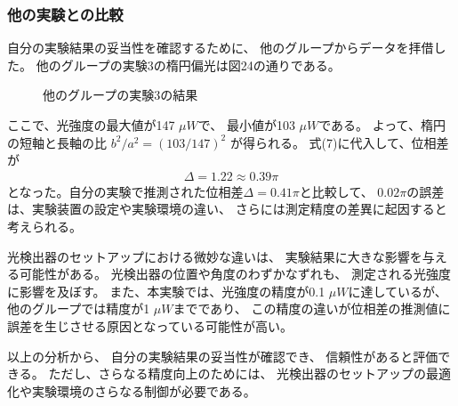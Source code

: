 \documentclass{article}
\begin{document}
\subsubsection*{他の実験との比較}
\begin{spacing}{1.2}
    自分の実験結果の妥当性を確認するために、
    他のグループからデータを拝借した。
    他のグループの実験3の楕円偏光は図24の通りである。\\
    \begin{wrapfigure}{r}{0.3\textwidth} %
        \caption{他のグループの実験3の結果}
        \label{fig:24}
    \end{wrapfigure}
    \indent
    ここで、光強度の最大値が147 $\mu W$で、
    最小値が103 $\mu W$である。
    よって、楕円の短軸と長軸の比 
    $b^2 / a^2 = (103 / 147)^2$ が得られる。
    式(7)に代入して、位相差が
    \begin{align*}
        \Delta = 1.22 \approx 0.39 \pi
    \end{align*}
    となった。自分の実験で推測された位相差$\Delta = 0.41\pi$と比較して、
    $0.02 \pi$の誤差は、実験装置の設定や実験環境の違い、
    さらには測定精度の差異に起因すると考えられる。

    光検出器のセットアップにおける微妙な違いは、
    実験結果に大きな影響を与える可能性がある。
    光検出器の位置や角度のわずかなずれも、
    測定される光強度に影響を及ぼす。
    また、本実験では、光強度の精度が0.1 $\mu W$に達しているが、
    他のグループでは精度が1 $\mu W$までであり、
    この精度の違いが位相差の推測値に誤差を生じさせる原因となっている可能性が高い。

    以上の分析から、
    自分の実験結果の妥当性が確認でき、
    信頼性があると評価できる。
    ただし、さらなる精度向上のためには、
    光検出器のセットアップの最適化や実験環境のさらなる制御が必要である。
\end{spacing}
\end{document}
